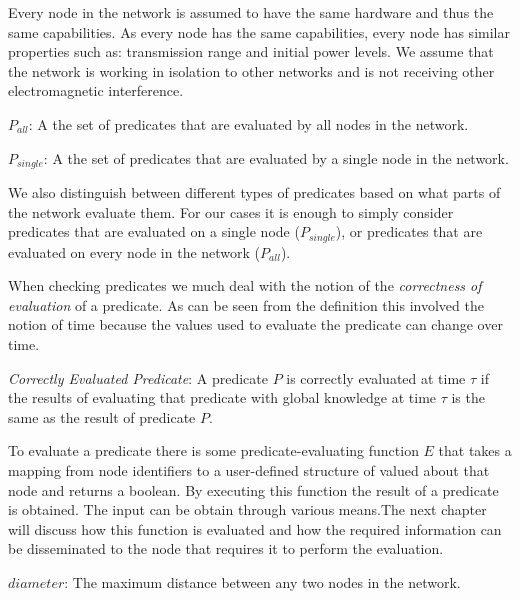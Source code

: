 Every node in the network is assumed to have the same hardware and thus the same capabilities. As every node has the same capabilities, every node has similar properties such as: transmission range and initial power levels. We assume that the network is working in isolation to other networks and is not receiving other electromagnetic interference.

\begin{mydef}
\emph{$P_{all}$}: A the set of predicates that are evaluated by all nodes in the network.
\end{mydef}

\begin{mydef}
\emph{$P_{single}$}: A the set of predicates that are evaluated by a single node in the network.
\end{mydef}

We also distinguish between different types of predicates based on what parts of the network evaluate them. For our cases it is enough to simply consider predicates that are evaluated on a single node ($P_{single}$), or predicates that are evaluated on every node in the network ($P_{all}$).

When checking predicates we much deal with the notion of the \emph{correctness of evaluation} of a predicate. As can be seen from the definition this involved the notion of time because the values used to evaluate the predicate can change over time.

\begin{mydef}
\emph{Correctly Evaluated Predicate}: A predicate $P$ is correctly evaluated at time $\tau$ if the results of evaluating that predicate with global knowledge at time $\tau$ is the same as the result of predicate $P$.
\end{mydef}

To evaluate a predicate there is some predicate-evaluating function $E$ that takes a mapping from node identifiers to a user-defined structure of valued about that node and returns a boolean. By executing this function the result of a predicate is obtained. The input can be obtain through various means.The next chapter will discuss how this function is evaluated and how the required information can be disseminated to the node that requires it to perform the evaluation.

\begin{mydef}
\emph{$diameter$}: The maximum distance between any two nodes in the network.
\end{mydef}

